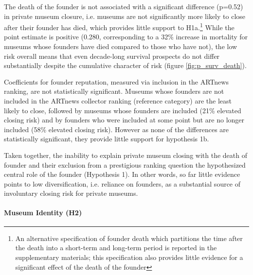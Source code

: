 \documentclass[12pt]{article}
\begin{document}
The death of the founder is not associated with a significant difference (p=0.52) in private museum closure, i.e. museums are not significantly more likely to close after their founder has died, which provides little support to H1a.\footnote{An alternative specification of founder death which partitions the time after the death into a short-term and long-term period is reported in the supplementary materials; this specification also provides little evidence for a significant effect of the death of the founder}
While the point estimate is positive (0.280, corresponding to a 32\% increase in mortality for museums whose founders have died compared to those who have not), the low risk overall means that even decade-long survival prospects do not differ substantially despite the cumulative character of risk (figure \ref{fig:p_surv_death}).



Coefficients for founder reputation, measured via inclusion in the ARTnews ranking, are not statistically significant.
Museums whose founders are not included in the ARTnews collector ranking (reference category) are the least likely to close, followed by museums whose founders are included (21\% elevated closing risk) and by founders who were included at some point but are no longer included (58\% elevated closing risk).
However as none of the differences are statistically significant, they provide little support for hypothesis 1b.




Taken together, the inability to explain private museum closing with the death of founder and their exclusion from a prestigious ranking question the hypothesized central role of the founder (Hypothesis 1).
In other words, so far little evidence points to low diversification, i.e. reliance on founders, as a substantial source of involuntary closing risk for private museums.
\paragraph*{Museum Identity (H2)}
\end{document}
